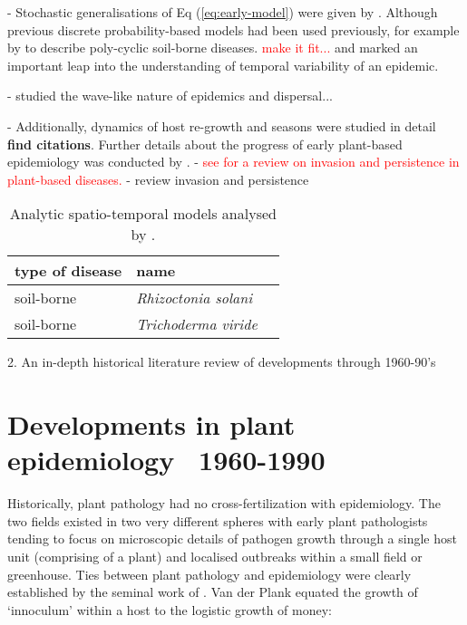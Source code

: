     - Stochastic generalisations of Eq (\ref{eq:early-model}) were given by \cite{doi:10.1098/rspb.1999.0841}. Although previous discrete probability-based models had been used previously, for example by \cite{pub.1034311339} to describe poly-cyclic soil-borne diseases. \textcolor{red}{make it fit...} and marked an important leap into the understanding of temporal variability of an epidemic.
    
    -\cite{ferrandino1993dispersive} studied the wave-like nature of epidemics and dispersal...
    
    - Additionally, dynamics of host re-growth and seasons were studied in detail \textbf{find citations}. Further details about the progress of early plant-based epidemiology was conducted by \cite{Gilligan-disease-management}.
    - \textcolor{red}{see\cite{doi:10.1146/annurev.phyto.45.062806.094357} for a review on invasion and persistence in plant-based diseases.} 
    - review invasion and persistence 
    \vspace{1em}
    \begin{table}[h]
    \centering
    \begin{tabular}{l l l}
    \hline
    \textbf{type of disease} & \textbf{name} \\
    \hline
    soil-borne  & \textit{Rhizoctonia solani} \\ 
    soil-borne & \textit{Trichoderma viride}
    \hline
    \end{tabular}
    \caption{Analytic spatio-temporal models analysed by \cite{jeger1983analysing}.}
    \label{table:1}
    \end{table}


2. An in-depth historical literature review of developments through 1960-90's
    
    \section{Developments in plant epidemiology ~1960-1990}
    Historically, plant pathology had no cross-fertilization with epidemiology. The two fields existed in two very different spheres with early plant pathologists tending to focus on microscopic details of pathogen growth through a single host unit (comprising of a plant) and localised outbreaks within a small field or greenhouse. Ties between plant pathology and epidemiology were clearly established by the seminal work of \cite{van2013plant}. Van der Plank equated the growth of `innoculum' within a host to the logistic growth of money:
    \begin{equation}
        \label{van-plank}
    \end{equation}
    
